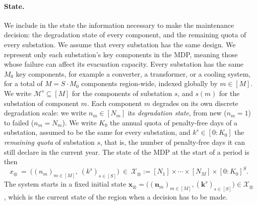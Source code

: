 \documentclass{article}
\begin{document}
\paragraph{State.} We include in the state the information necessary to make the maintenance decision: the degradation state of every component, and the remaining quota of every substation.
We assume that every substation has the same design. We represent only each substation's key
components in the MDP, meaning those whose failure can affect its evacuation capacity. Every substation has the same
$M_0$ key components, for example a converter, a transformer, or a cooling system, for a total of $M = S \cdot M_0$
components region-wide, indexed globally by $m \in [M]$. We write $\mathcal{M}^s \subseteq [M]$ for the components
of substation $s$, and $s(m)$ for the substation of component $m$.
Each component $m$ degrades on its own discrete degradation scale: we write $n_m \in [N_m]$ its \emph{degradation
state}, from new ($n_m=1$) to failed ($n_m=N_m$). We write $K_0$ the annual quota of penalty-free days of a substation, assumed to be the same
for every substation, and $k^s \in [0:K_0]$ the \emph{remaining quota} of substation $s$, that is, the number of penalty-free days it can still declare in the current year. The state of the MDP at the start of a period is then
\[
x_\otimes \ =\ \big( (n_m)_{m \in [M]},\ (k^s)_{s \in [S]} \big) \ \in\ \mathcal{X}_\otimes := [N_1] \times \cdots \times [N_M] \times [0:K_0]^S.
\]
The system starts in a fixed initial state $\mathbf{x}_\otimes = \big( (\mathbf{n}_m)_{m \in [M]}, (\mathbf{k}^s)_{s \in
[S]} \big) \in \mathcal{X}_\otimes$, which is the current state of the region when a decision has to be made.
\end{document}
